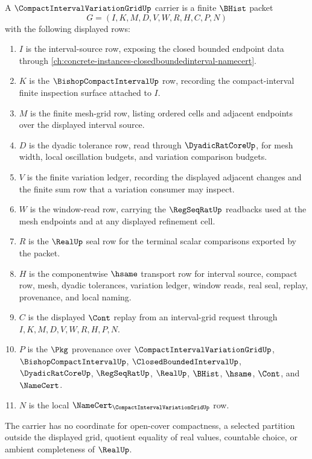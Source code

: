 \begin{definition}
\label{def:compact-interval-variation-grid-carrier}
A $\CompactIntervalVariationGridUp$ carrier is a finite $\BHist$ packet
$$
G=(I,K,M,D,V,W,R,H,C,P,N)
$$
with the following displayed rows:
\begin{enumerate}
\item $I$ is the interval-source row, exposing the closed bounded endpoint data through \autoref{ch:concrete-instances-closedboundedinterval-namecert}.
\item $K$ is the $\BishopCompactIntervalUp$ row, recording the compact-interval finite inspection surface attached to $I$.
\item $M$ is the finite mesh-grid row, listing ordered cells and adjacent endpoints over the displayed interval source.
\item $D$ is the dyadic tolerance row, read through $\DyadicRatCoreUp$, for mesh width, local oscillation budgets, and variation comparison budgets.
\item $V$ is the finite variation ledger, recording the displayed adjacent changes and the finite sum row that a variation consumer may inspect.
\item $W$ is the window-read row, carrying the $\RegSeqRatUp$ readbacks used at the mesh endpoints and at any displayed refinement cell.
\item $R$ is the $\RealUp$ seal row for the terminal scalar comparisons exported by the packet.
\item $H$ is the componentwise $\hsame$ transport row for interval source, compact row, mesh, dyadic tolerances, variation ledger, window reads, real seal, replay, provenance, and local naming.
\item $C$ is the displayed $\Cont$ replay from an interval-grid request through $I,K,M,D,V,W,R,H,P,N$.
\item $P$ is the $\Pkg$ provenance over $\CompactIntervalVariationGridUp$, $\BishopCompactIntervalUp$, $\ClosedBoundedIntervalUp$, $\DyadicRatCoreUp$, $\RegSeqRatUp$, $\RealUp$, $\BHist$, $\hsame$, $\Cont$, and $\NameCert$.
\item $N$ is the local $\NameCert_{\CompactIntervalVariationGridUp}$ row.
\end{enumerate}
The carrier has no coordinate for open-cover compactness, a selected partition outside the displayed grid, quotient equality of real values, countable choice, or ambient completeness of $\RealUp$.
\end{definition}


